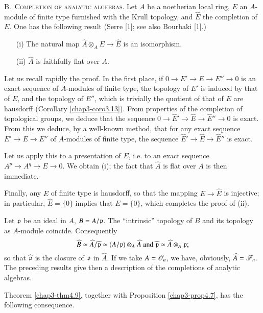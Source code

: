 B.~\textsc{Completion of analytic algebras.} Let $A$ be a noetherian local ring, $E$ an $A$-module of finite type furnished with the Krull topology, and $\widehat{E}$ the completion of $E$. One has the following result (Serre [1]; see also Bourbaki [1].)

\begin{theorem}\label{chap3-thm4.9}
\begin{itemize}
\item[\rm(i)] The natural map $\widehat{A}\otimes_{A}E\to \widehat{E}$ is an isomorphism.

\item[\rm(ii)] $\widehat{A}$ is faithfully flat over $A$.
\end{itemize}
\end{theorem}

Let us recall rapidly the proof. In the first place, if $0\to E'\to E\to E''\to 0$ is an exact sequence of $A$-modules of finite type, the topology of $E'$ is induced by that of $E$, and the topology of $E''$, which is trivially the quotient of that of $E$ are hausdorff (Corollary \ref{chap3-coro3.13}). From properties of the completion of topological groups, we deduce that the sequence $0\to \widehat{E}'\to \widehat{E}\to \widehat{E}''\to 0$ is exact. From this we deduce, by a well-known method, that for any exact sequence $E'\to E\to E''$ of $A$-modules of finite type, the sequence $\widehat{E}'\to \widehat{E}\to \widehat{E}''$ is exact.

Let us apply this to a presentation of $E$, i.e. to an exact sequence $A^{p}\to A^{q}\to E\to 0$. We obtain (i); the fact that $\widehat{A}$ is flat over $A$ is then immediate.

Finally, any $E$ of finite type is hausdorff, so that the mapping $E\to \widehat{E}$ is injective; in particular, $\widehat{E}=\{0\}$ implies that $E=\{0\}$, which completes the proof of (ii).

Let $\mathfrak{p}$ be an ideal in $A$, $B=A/\mathfrak{p}$. The ``intrinsic'' topology of $B$ and its topology as $A$-module coincide. Consequently 
$$
\widehat{B}\simeq \widehat{A}/\widehat{\mathfrak{p}}\simeq (A/\mathfrak{p})\otimes_{A}\widehat{A}\text{ and } \widehat{\mathfrak{p}}\simeq \widehat{A}\otimes_{A}\mathfrak{p};
$$
so that $\widehat{\mathfrak{p}}$ is the closure of $\mathfrak{p}$ in $\widehat{A}$. If we take $A=\mathscr{O}_{n}$, we have, obviously, $\widehat{A}=\mathscr{F}_{n}$. The preceding results give then a description of the completions of analytic algebras.

Theorem \ref{chap3-thm4.9}, together with Proposition \ref{chap3-prop4.7}, has the following consequence.

